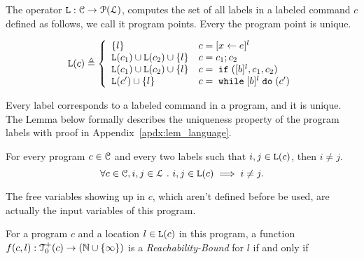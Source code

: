 The operator $\mathtt{L}: \mathcal{C} \to \mathcal{P}(\mathcal{L})$,
computes the set of all labels
in a labeled command $c$ defined as follows, we call it program points.
Every the program point is unique.
\begin{defn}
\label{def:lvar}
{\small
\[
  \lvar(c) \triangleq
  \left\{
  \begin{array}{ll}
      \{l\}                  
      & {c} = [{\assign x e}]^{l} 
      \\
      \lvar({c_1}) \cup \lvar({{c_2}})  \cup \{l\} 
      & {c} = {c_1};{c_2}
      \\
      \lvar(c_1) \cup \lvar({{c_2}}) \cup \{l\} 
      & {c} =\eif([\bexpr]^{l}, c_1, c_2) 
      \\
      \lvar(c') \cup \{l\} 
      & {c}   = \ewhile [\bexpr]^{l} \edo (c')
\end{array}
\right.
\]
}
\end{defn}
%
Every label corresponds to a labeled command in a program, and it is unique.
The Lemma below formally describes the uniqueness property of the program labels
with proof in Appendix~\ref{apdx:lem_language}.
\begin{lem}
  \label{lem:label_unique}
  For every program $c \in \mathcal{C}$ and every two labels such that
  $i, j \in \mathtt{L}(c)$, then $i \neq j$.
  \[
    \forall c \in \mathcal{C}, i, j \in \mathcal{L} ~.~ i, j \in \mathtt{L}(c)\implies i \neq j.
    \]
\end{lem}
%
The free variables
showing up in $c$, which aren't defined before be used, are actually the input variables of this program.
%
\begin{defn}
  \label{def:rb}
  For a program ${c}$ and a location $l \in \mathtt{L}(c)$ in this program,
a function $f(c, l) : \mathcal{T}^{+}_0(c) \to (\mathbb{N} \cup \{\infty\})$ is a \emph{Reachability-Bound} for $l$ if and only if
\end{defn}
